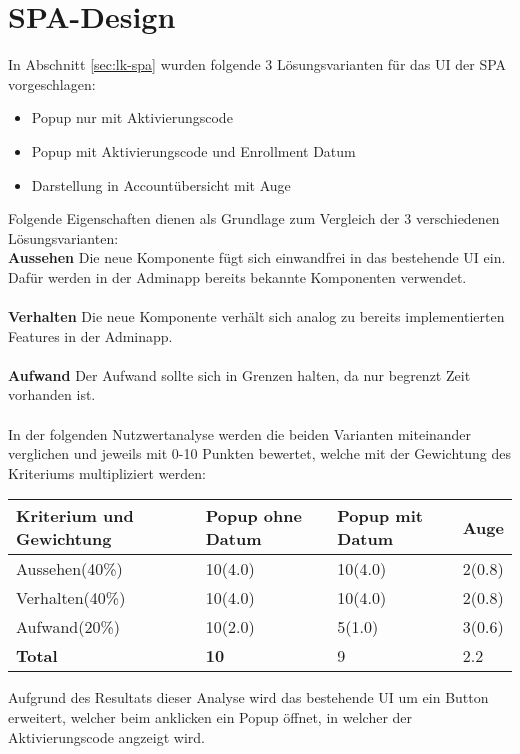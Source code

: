 \section{SPA-Design}
In Abschnitt \ref{sec:lk-spa} wurden folgende 3 Lösungsvarianten für das UI der SPA vorgeschlagen:

\begin{itemize}
	\item Popup nur mit Aktivierungscode
	\item Popup mit Aktivierungscode und Enrollment Datum
	\item Darstellung in Accountübersicht mit Auge
\end{itemize}
Folgende Eigenschaften dienen als Grundlage zum Vergleich der 3 verschiedenen Lösungsvarianten:
\newline\\
\textbf{Aussehen} Die neue Komponente fügt sich einwandfrei in das bestehende UI ein. Dafür werden in der Adminapp bereits bekannte Komponenten verwendet.\\\\
\textbf{Verhalten} Die neue Komponente verhält sich analog zu bereits implementierten Features in der Adminapp.
\\\\
\textbf{Aufwand} Der Aufwand sollte sich in Grenzen halten, da nur begrenzt Zeit vorhanden ist.
\\
\\
In der folgenden Nutzwertanalyse werden die beiden Varianten miteinander verglichen und jeweils mit 0-10 Punkten bewertet, welche mit der Gewichtung des Kriteriums multipliziert werden:
\begin{longtable}{|p{}|p{}|p{}|p{}|}
	\hline
	\textbf{Kriterium und Gewichtung} & \textbf{Popup ohne Datum} & \textbf{Popup mit Datum} &\textbf{Auge} \\ \hline
	Aussehen(40\%)& 10(4.0)  & 10(4.0) & 2(0.8)\\ \hline 
	Verhalten(40\%) & 10(4.0)  &  10(4.0) & 2(0.8)\\ \hline 
	Aufwand(20\%) & 10(2.0)  &  5(1.0)   & 3(0.6)\\ \hline 
	\textbf{Total} & \textbf{10}  &  9 & 2.2\\ \hline 
\end{longtable}
\noindent Aufgrund des Resultats dieser Analyse wird das bestehende UI um ein Button erweitert, welcher beim anklicken ein Popup öffnet, in welcher der Aktivierungscode angzeigt wird.

